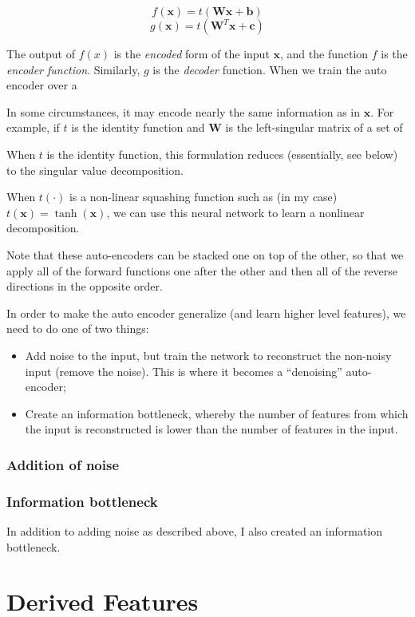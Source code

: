 \documentclass{article}
\begin{document}
$$
f(\mathbf{x}) = t(\mathbf{Wx} + \mathbf{b})
$$
$$
g(\mathbf{x}) = t(\mathbf{W}^T\mathbf{x} + \mathbf{c})
$$

The output of $f(x)$ is the \emph{encoded} form of the input $\mathbf{x}$, and the function $f$ is the \emph{encoder function}.  Similarly, $g$ is the \emph{decoder} function.  When we train the auto encoder over a 

In some circumstances, it may encode nearly the same information as in $\mathbf{x}$.  For example, if $t$ is the identity function and $\mathbf{W}$ is the left-singular matrix of a set of 

When $t$ is the identity function, this formulation reduces (essentially, see below) to the singular value decomposition.

When $t(\cdot)$ is a non-linear squashing function such as (in my case) $t(\mathbf{x}) = \tanh(\mathbf{x})$, we can use this neural network to learn a nonlinear decomposition.

Note that these auto-encoders can be stacked one on top of the other, so that we apply all of the forward functions one after the other and then all of the reverse directions in the opposite order.

In order to make the auto encoder generalize (and learn higher level features), we need to do one of two things:

\begin{itemize}
\item Add noise to the input, but train the network to reconstruct the non-noisy input (remove the noise).  This is where it becomes a ``denoising'' auto-encoder;
\item Create an information bottleneck, whereby the number of features from which the input is reconstructed is lower than the number of features in the input.
\end{itemize}

\subsubsection{Addition of noise}

\subsubsection{Information bottleneck}

In addition to adding noise as described above, I also created an information bottleneck.

\section{Derived Features}
\end{document}
